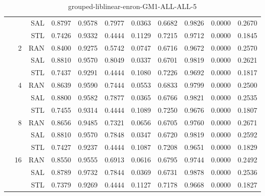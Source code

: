 \begin{center}
\begin{table}[htbp]
\begin{center}
\begin{tabular}{ | r | r | r | r | r | r | r | r | r | r | r |}
 &   & SAL & 0.8797 & 0.9578 & 0.7977 & 0.0363 & 0.6682 & 0.9826 & 0.0000 & 0.2670\\ \cline{3-11}
 &   & STL & 0.7426 & 0.9332 & 0.4444 & 0.1129 & 0.7215 & 0.9712 & 0.0000 & 0.1845\\ \cline{2-11}
 & \multirow{3}{*}{2} & RAN & 0.8400 & 0.9275 & 0.5742 & 0.0747 & 0.6716 & 0.9672 & 0.0000 & 0.2570\\ \cline{3-11}
 &   & SAL & 0.8810 & 0.9570 & 0.8049 & 0.0337 & 0.6701 & 0.9819 & 0.0000 & 0.2621\\ \cline{3-11}
 &   & STL & 0.7437 & 0.9291 & 0.4444 & 0.1080 & 0.7226 & 0.9692 & 0.0000 & 0.1817\\ \cline{2-11}
 & \multirow{3}{*}{4} & RAN & 0.8639 & 0.9590 & 0.7444 & 0.0553 & 0.6833 & 0.9799 & 0.0000 & 0.2500\\ \cline{3-11}
 &   & SAL & 0.8800 & 0.9582 & 0.7877 & 0.0365 & 0.6766 & 0.9821 & 0.0000 & 0.2535\\ \cline{3-11}
 &   & STL & 0.7455 & 0.9314 & 0.4444 & 0.1089 & 0.7250 & 0.9676 & 0.0000 & 0.1807\\ \cline{2-11}
 & \multirow{3}{*}{8} & RAN & 0.8656 & 0.9485 & 0.7321 & 0.0656 & 0.6705 & 0.9760 & 0.0000 & 0.2671\\ \cline{3-11}
 &   & SAL & 0.8810 & 0.9570 & 0.7848 & 0.0347 & 0.6720 & 0.9819 & 0.0000 & 0.2592\\ \cline{3-11}
 &   & STL & 0.7427 & 0.9237 & 0.4444 & 0.1087 & 0.7208 & 0.9651 & 0.0000 & 0.1829\\ \cline{2-11}
 & \multirow{3}{*}{16} & RAN & 0.8550 & 0.9555 & 0.6913 & 0.0616 & 0.6795 & 0.9744 & 0.0000 & 0.2492\\ \cline{3-11}
 &   & SAL & 0.8789 & 0.9732 & 0.7844 & 0.0369 & 0.6731 & 0.9878 & 0.0000 & 0.2536\\ \cline{3-11}
 &   & STL & 0.7379 & 0.9269 & 0.4444 & 0.1127 & 0.7178 & 0.9668 & 0.0000 & 0.1827\\ \cline{2-11}
\hline
\end{tabular}
\caption{grouped-liblinear-enron-GM1-ALL-ALL-5}
\end{center}
 \end{table}
\end{center}

